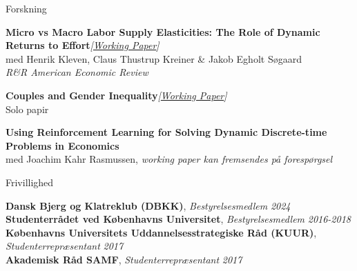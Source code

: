 \documentclass[
	11pt, %
]{resume} %
\begin{document}
\newpage


\begin{rSection}{Forskning}

    \textbf{Micro vs Macro Labor Supply Elasticities: The Role of Dynamic Returns to Effort}\hfill \textit{[\href{https://www.nber.org/papers/w31549}{Working Paper}]} \\
    med Henrik Kleven, Claus Thustrup Kreiner \& Jakob Egholt Søgaard \\
    \textit{R\&R American Economic Review}

    \textbf{Couples and Gender Inequality}\hfill \textit{[\href{https://ssrn.com/abstract=4697847}{Working Paper}]} \\
    Solo papir

    \textbf{Using Reinforcement Learning for Solving Dynamic Discrete-time Problems in Economics} \\
    med Joachim Kahr Rasmussen, \textit{working paper kan fremsendes på forespørgsel}
\end{rSection}



\begin{rSection}{Frivillighed}

    \textbf{Dansk Bjerg og Klatreklub (DBKK)}, \textit{Bestyrelsesmedlem} \hfill \textit{2024} \\
    \textbf{Studenterrådet ved Københavns Universitet}, \textit{Bestyrelsesmedlem} \hfill \textit{2016-2018} \\
    \textbf{Københavns Universitets Uddannelsesstrategiske Råd (KUUR)}, \textit{Studenterrepræsentant} \hfill \textit{2017} \\
    \textbf{Akademisk Råd SAMF}, \textit{Studenterrepræsentant} \hfill \textit{2017} \\

\end{rSection}

\end{document}
